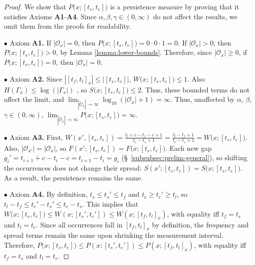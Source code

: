 \documentclass[sigconf]{acmart}
\newcommand{\pattern}{x}
\newcommand{\x}{x}
\newcommand{\intervalStart}{t_s}
\newcommand{\intervalEnd}{t_e}
\newcommand{\interval}{[\intervalStart, \intervalEnd]}
\newcommand{\intervalWidth}{|\interval|}
\newcommand{\occs}{\mathcal{O}}
\newcommand{\uniqueOccs}{\tilde{\occs}}
\newcommand{\firstOcc}{t_f}
\newcommand{\lastOcc}{t_l}
\newcommand{\occInterval}{[\firstOcc,\lastOcc]}
\newcommand{\occIntervalsmall}{[t_s',t_e']}
\newcommand{\occIntervalWidth}{|\occInterval_\x|}
\newcommand{\freq}{F}
\newcommand{\freqLong}{\freq\big(x;\interval\big)}
\newcommand{\width}{W}
\newcommand{\widthLong}{\width\big(\pattern; \interval\big)}
\newcommand{\spread}{S}
\newcommand{\spreadLong}{\spread\big(\pattern; \interval\big)}
\newcommand{\entropy}{H}
\newcommand{\persistence}{P}
\newcommand{\persistenceLong}{P\big(x;[\intervalStart,\intervalEnd]\big)}
\newcommand{\gaps}{\Gamma}
\newcommand{\gap}{g}
\newcommand{\wExp}{\alpha}
\newcommand{\fExp}{\beta}
\newcommand{\sExp}{\gamma}
\newcommand{\axiomOne}{\textbf{A1}}
\newcommand{\axiomTwo}{\textbf{A2}}
\newcommand{\axiomThree}{\textbf{A3}}
\newcommand{\axiomFour}{\textbf{A4}}
\begin{document}
\begin{proof}
    We show that $\persistenceLong$ is a persistence measure by proving that it satisfies Axioms \axiomOne-\axiomFour. Since $\alpha, \beta, \gamma \in (0,\infty)$ do not affect the results, we omit them from the proofs for readability. 
    
     $\bullet$ Axiom \textbf{\axiomOne.} If $|\occs_\x| = 0$, then $\persistenceLong = 0 \cdot 0 \cdot 1 = 0$.
    If $|\occs_\x| > 0$, then $\persistenceLong > 0$, by Lemma \ref{lemma:lower-bounds}.
    Therefore, since $|\occs_\x| \geq 0$, if $\persistenceLong = 0$, then $|\occs_\x| = 0$.
    
     $\bullet$ Axiom \textbf{\axiomTwo.} Since $\occIntervalWidth \leq \intervalWidth$, $\widthLong \leq 1$. 
     Also $\entropy(\gaps_\x) \leq \log(|\gaps_\x|)$ \cite{cover2012elements}, so $\spreadLong \leq 2$. Thus, these bounded terms do not affect the limit, and $\textstyle \lim_{|\uniqueOccs_\x| \rightarrow \infty} \log_{10}(|\occs_\x| + 1) = \infty$. 
     Thus, unaffected by $\wExp$, $\fExp$, $\sExp \in (0,\infty)$, 
     $\textstyle \lim_{|\uniqueOccs_\x| \rightarrow \infty} \persistenceLong = \infty$.
    
     $\bullet$  Axiom \textbf{\axiomThree.} First, $\width(\pattern', \interval) = \frac{\lastOcc + c - \firstOcc - c + 1}{\intervalEnd - \intervalStart + 1} = \frac{\lastOcc - \firstOcc + 1}{\intervalEnd - \intervalStart + 1} = \widthLong$. 
    Also, $|\occs_{\x'}| = |\occs_\x|$, so $\freq(\pattern'; \interval) = \freqLong$. Each new gap $\gap_i' = t_{i+1} + c - t_i - c = t_{i+1} - t_i = \gap_i$ (\S~\ref{subsubsec:prelim-general}), so shifting the occurrences does not change their spread: $\spread(\pattern'; \interval) = \spreadLong$. 
    As a result, the persistence remains the same.
     
    
     $\bullet$  Axiom \textbf{\axiomFour.} By definition, $t_s \leq t_s' \leq t_f$ and $t_e \geq t_e' \geq t_l$, 
     so $\lastOcc - \firstOcc \leq \intervalEnd' - \intervalStart' \leq \intervalEnd - \intervalStart$. This implies that $\widthLong \leq \width(\pattern;\occIntervalsmall) \leq \width(\pattern;\occInterval_\x)$, with equality iff $\firstOcc = \intervalStart$ and $\lastOcc = \intervalEnd$. Since all occurrences fall in $\occInterval_\x$ by definition, the frequency and spread terms remain the same upon shrinking the measurement interval. 
     Therefore, $\persistenceLong \leq \persistence(\pattern;\occIntervalsmall) \leq \persistence(\pattern;\occInterval_\x)$, with equality iff $\firstOcc = \intervalStart$ and $\lastOcc = \intervalEnd$. \qedhere
     
\end{proof}
\end{document}

